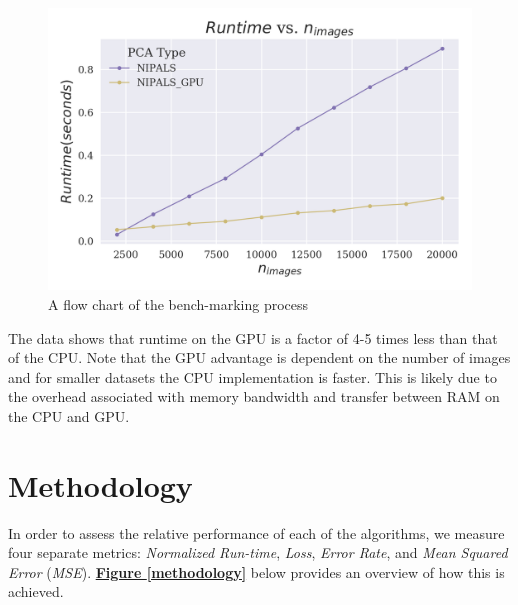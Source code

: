 \documentclass[12pt]{article}
\begin{document}
\begin{figure}[H]
\begin{center}
\includegraphics[width=\textwidth]{U_GPU.png}
\caption{A flow chart of the bench-marking process}
\label{parallelization}
\end{center}
\end{figure}

The data shows that runtime on the GPU is a factor of 4-5 times less than that of the CPU. Note that the GPU advantage is dependent on the number of images and for smaller datasets the CPU implementation is faster. This is likely due to the overhead associated with memory bandwidth and transfer between RAM on the CPU and GPU.

\pagebreak
\section{Methodology} \label{4}

    In order to assess the relative performance of each of the algorithms, we measure four separate metrics: \textit{Normalized Run-time}, \textit{Loss},  \textit{Error Rate}, and \textit{Mean Squared Error} (\textit{MSE}). \textbf{\hyperref[methodology]{Figure \ref*{methodology}}} below provides an overview of how this is achieved.
    
\end{document}
